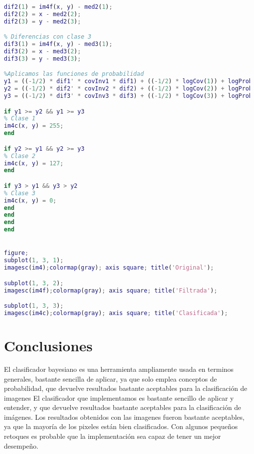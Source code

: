 \documentclass[10pt,journal,compsoc]{IEEEtran}
\begin{document}
\begin{lstlisting}[language=Matlab,basicstyle=\small]
% Diferencias con clase 2
dif2(1) = im4f(x, y) - med2(1);
dif2(2) = x - med2(2);
dif2(3) = y - med2(3);

% Diferencias con clase 3
dif3(1) = im4f(x, y) - med3(1);
dif3(2) = x - med3(2);
dif3(3) = y - med3(3);

%Aplicamos las funciones de probabilidad
y1 = ((-1/2) * dif1' * covInv1 * dif1) + ((-1/2) * logCov(1)) + logProb(1);
y2 = ((-1/2) * dif2' * covInv2 * dif2) + ((-1/2) * logCov(2)) + logProb(2);
y3 = ((-1/2) * dif3' * covInv3 * dif3) + ((-1/2) * logCov(3)) + logProb(3);

if y1 >= y2 && y1 >= y3
% Clase 1
im4c(x, y) = 255;
end

if y2 >= y1 && y2 >= y3
% Clase 2
im4c(x, y) = 127;
end

if y3 > y1 && y3 > y2
% Clase 3
im4c(x, y) = 0;
end
end
end
end


figure;
subplot(1, 3, 1);
imagesc(im4);colormap(gray); axis square; title('Original');

subplot(1, 3, 2);
imagesc(im4f);colormap(gray); axis square; title('Filtrada');

subplot(1, 3, 3);
imagesc(im4c);colormap(gray); axis square; title('Clasificada');

\end{lstlisting}
\section{Conclusiones}

El clasificador bayesiano es una herramienta ampliamente usada en terminos generales, bastante sencilla de aplicar, ya que solo emplea conceptos de probabilidad, que devuelve resultados bastante aceptables para la clasificación de imagenes
El clasificador que implementamos es bastante sencillo de aplicar y entender, y  que devuelve resultados bastante aceptables para la clasificación de imágenes.
Los resultados obtenidos con las imagenes fueron bastante aceptables, ya que la mayoría de los pixeles están bien clasificados. Con algunos pequeños retoques es probable que la implementación sea capaz de tener un mejor desempeño.


\end{document}
